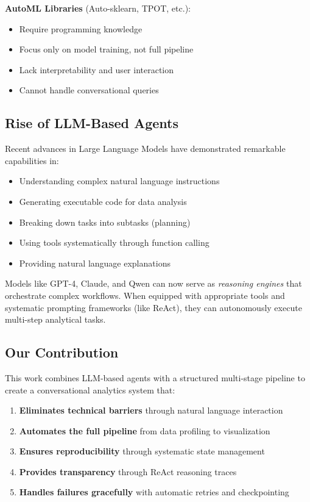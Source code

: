 \documentclass[11pt,a4paper]{article}
\begin{document}
\textbf{AutoML Libraries} (Auto-sklearn, TPOT, etc.):
\begin{itemize}
    \item Require programming knowledge
    \item Focus only on model training, not full pipeline
    \item Lack interpretability and user interaction
    \item Cannot handle conversational queries
\end{itemize}

\subsection{Rise of LLM-Based Agents}

Recent advances in Large Language Models have demonstrated remarkable capabilities in:

\begin{itemize}
    \item Understanding complex natural language instructions
    \item Generating executable code for data analysis
    \item Breaking down tasks into subtasks (planning)
    \item Using tools systematically through function calling
    \item Providing natural language explanations
\end{itemize}

Models like GPT-4, Claude, and Qwen can now serve as \textit{reasoning engines} that orchestrate complex workflows. When equipped with appropriate tools and systematic prompting frameworks (like ReAct), they can autonomously execute multi-step analytical tasks.

\subsection{Our Contribution}

This work combines LLM-based agents with a structured multi-stage pipeline to create a conversational analytics system that:

\begin{enumerate}
    \item \textbf{Eliminates technical barriers} through natural language interaction
    \item \textbf{Automates the full pipeline} from data profiling to visualization
    \item \textbf{Ensures reproducibility} through systematic state management
    \item \textbf{Provides transparency} through ReAct reasoning traces
    \item \textbf{Handles failures gracefully} with automatic retries and checkpointing
\end{enumerate}
\end{document}
